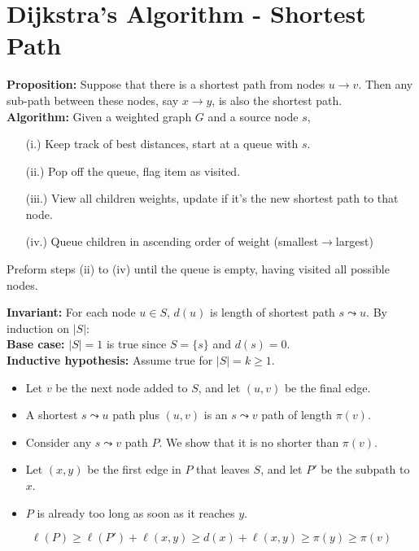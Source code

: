 \vspace{-1.5em}
\section{Dijkstra's Algorithm - Shortest Path}
\begin{theo}
    
    \textbf{Proposition:} Suppose that there is a shortest path from nodes $u\to v$. Then any
    sub-path between these nodes, say $x\to y$, is also the shortest path.\\

    \noindent
    \textbf{Algorithm:} Given a weighted graph $G$ and a source node $s$, 
    \begin{enumerate}
        \item [(i.)] Keep track of best distances, start at a queue with $s$.
        \item [(ii.)] Pop off the queue, flag item as visited.
        \item [(iii.)] View all children weights, update if it's the new shortest path to that node.
        \item [(iv.)] Queue children in ascending order of weight (smallest$\to$largest)
    \end{enumerate}
    Preform steps (ii) to (iv) until the queue is empty, having visited all possible nodes.
\end{theo}


\vspace{-1em}
\begin{Proof}

    \textbf{Invariant:} For each node $u \in S$, $d(u)$ is length of shortest path $s \leadsto u$. By induction on $|S|$:\\
    \textbf{Base case:} $|S| = 1$ is true since $S = \{s\}$ and $d(s) = 0$.\\
    \textbf{Inductive hypothesis:} Assume true for $|S| = k \geq 1$.
    \begin{itemize}
        \item Let $v$ be the next node added to $S$, and let $(u, v)$ be the final edge.
        \item A shortest $s \leadsto u$ path plus $(u, v)$ is an $s \leadsto v$ path of length $\pi(v)$.
        \item Consider any $s \leadsto v$ path $P$. We show that it is no shorter than $\pi(v)$.
        \item Let $(x, y)$ be the first edge in $P$ that leaves $S$, and let $P'$ be the subpath to $x$.
        \item $P$ is already too long as soon as it reaches $y$.
    \end{itemize}
    \[
    \ell(P) \geq \ell(P') + \ell(x, y) \geq d(x) + \ell(x, y) \geq \pi(y) \geq \pi(v)
    \]
    \end{Proof}
    
